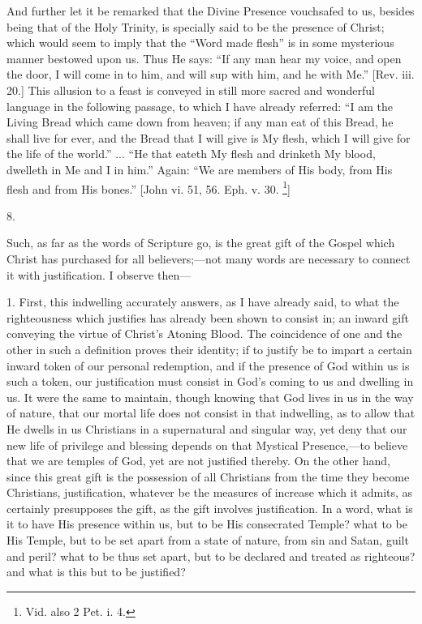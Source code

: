 And further let it be remarked that the Divine Presence vouchsafed
to us, besides being that of the Holy Trinity, is specially said to be
the presence of Christ; which would seem to imply that the ``Word
made flesh'' is in some mysterious manner bestowed upon us. Thus
He says: ``If any man hear my voice, and open the door, I will
come in to him, and will sup with him, and he with Me.'' [Rev.
iii. 20.] This allusion to a feast is conveyed in still more sacred
and wonderful language in the following passage, to which I have
already referred: ``I am the Living Bread which came down from
heaven; if any man eat of this Bread, he shall live for ever, and the
Bread that I will give is My flesh, which I will give for the life of
the world.'' ... ``He that eateth My flesh and drinketh My
blood, dwelleth in Me and I in him.'' Again: ``We are members
of His body, from His flesh and from His bones.'' [John vi. 51,
56. Eph. v. 30. \footnote{Vid. also 2
Pet. i. 4.}]

8.

Such, as far as the words of Scripture go, is the great gift of the
Gospel which Christ has purchased for all believers;—not many words
are necessary to connect it with justification. I observe then—

1. First, this indwelling accurately answers, as I have already
said, to what the righteousness which justifies has already been shown
to consist in; an inward gift conveying the virtue of Christ's
Atoning Blood. The coincidence of one and the other in such a
definition proves their identity; if to justify be to impart a certain
inward token of our personal redemption, and if the presence of God
within us is such a token, our justification must consist in God's
coming to us and dwelling in us. It were the same to maintain, though
knowing that God lives in us in the way of nature, that our mortal
life does not consist in that indwelling, as to allow that He dwells
in us Christians in a supernatural and singular way, yet deny that our
new life of privilege and blessing depends on that Mystical Presence,—to
believe that we are temples of God, yet are not justified thereby. On
the other hand, since this great gift is the possession of all
Christians from the time they become Christians, justification,
whatever be the measures of increase which it admits, as certainly
presupposes the gift, as the gift involves justification. In a word,
what is it to have His presence within us, but to be His consecrated
Temple? what to be His Temple, but to be set apart from a state of
nature, from sin and Satan, guilt and peril? what to be thus set
apart, but to be declared and treated as righteous? and what is this
but to be justified?

